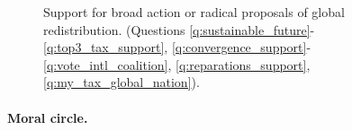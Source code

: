 \documentclass[12pt,english]{article}
\begin{document}
\begin{bibunit}


\begin{figure}[h!]
    \caption[Support for broad or radical global redistribution]{Support for broad action or radical proposals of global redistribution. \hfill (Questions \ref{q:sustainable_future}-\ref{q:top3_tax_support}, \ref{q:convergence_support}-\ref{q:vote_intl_coalition}, \ref{q:reparations_support}, \ref{q:my_tax_global_nation}).
    }\label{fig:radical_redistr_share} 
\end{figure}

\paragraph{Moral circle.}


\end{bibunit}
\end{document}
